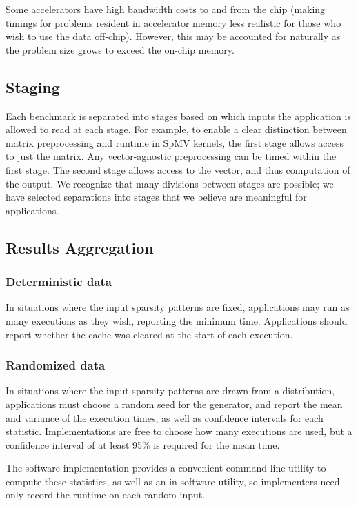 \documentclass{article}
\begin{document}
Some accelerators have high bandwidth costs to and from the chip (making timings for problems resident in accelerator memory less realistic for those who wish to use the data off-chip). However, this may be accounted for naturally as the problem size grows to exceed the on-chip memory.

\subsection{Staging}

Each benchmark is separated into stages based on which inputs the application is allowed to read at each stage. For example, to enable a clear distinction between matrix preprocessing and runtime in SpMV kernels, the first stage allows access to just the matrix. Any vector-agnostic preprocessing can be timed within the first stage. The second stage allows access to the vector, and thus computation of the output. We recognize that many divisions between stages are possible; we have selected separations into stages that we believe are meaningful for applications.

\subsection{Results Aggregation}

\subsubsection{Deterministic data}

    In situations where the input sparsity patterns are fixed, applications may run as many executions as they wish, reporting the minimum time. Applications should report whether the cache was cleared at the start of each execution.

\subsubsection{Randomized data}

    In situations where the input sparsity patterns are drawn from a distribution, applications must choose a random seed for the generator, and report the mean and variance of the execution times, as well as confidence intervals for each statistic. Implementations are free to choose how many executions are used, but a confidence interval of at least 95\% is required for the mean time.

    The software implementation provides a convenient command-line utility to compute these statistics, as well as an in-software utility, so implementers need only record the runtime on each random input.
\end{document}

